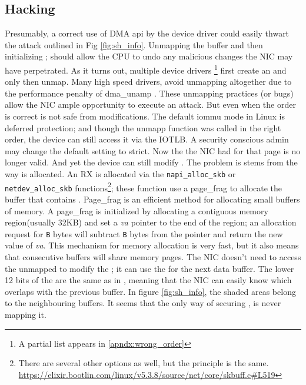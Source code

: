 \subsection{Hacking \shinfo}
Presumably, a correct use of DMA api by the device driver could easily thwart the attack outlined in Fig \ref{fig:sh_info}. Unmapping the buffer and then initializing \shinfo; should allow the CPU to undo any malicious changes the NIC may have perpetrated. As it turns out, multiple device drivers \footnote{A partial list appears in \ref{apndx:wrong_order}} first create an \skb and only then unmap. Many high speed drivers, avoid unmapping altogether due to the performance penalty of dma\_unamp \cite{MMT16,MSMT18}. These unmapping practices (or bugs) allow the NIC ample opportunity to execute an attack. But even when the order is correct \shinfo is not safe from modifications. The default iommu mode in Linux is deferred protection; and though the unmapp function was called in the right order, the device can still access it via the IOTLB. A security conscious admin may change the default setting to strict. Now the \iova the NIC had for that page is no longer valid. And yet the device can still modify \shinfo. The problem is stems from the way \shinfo is allocated. An RX \skb is allocated via the \texttt{napi\_alloc\_skb} or \texttt{netdev\_alloc\_skb} functions\footnote{There are several other options as well, but the principle is the same. \url{https://elixir.bootlin.com/linux/v5.3.8/source/net/core/skbuff.c\#L519}}; these function use a page\_frag to allocate the \data buffer that contains \shinfo. Page\_frag is an efficient method for allocating small buffers of memory. A page\_frag is initialized by allocating a contiguous memory region(usually 32KB) and set a \textit{va} pointer to the end of the region; an allocation request for \texttt{B} bytes will subtract \texttt{B} bytes from the pointer and return the new value of \textit{va}. 
This mechanism for memory allocation is very fast, but it also means that consecutive \data buffers will share memory pages. The NIC doesn't need to access the unmapped \iova to modify the \shinfo; it can use the \iova for the next data buffer. The lower 12 bits of the \iova  are the same as in \kva, meaning that the NIC can easily know which \iova overlaps with the previous buffer. In figure \ref{fig:sh_info}, the shaded areas belong to the neighbouring \data buffers. It seems that the only way of securing \shinfo, is never mapping it\cite{MSMT18}.

